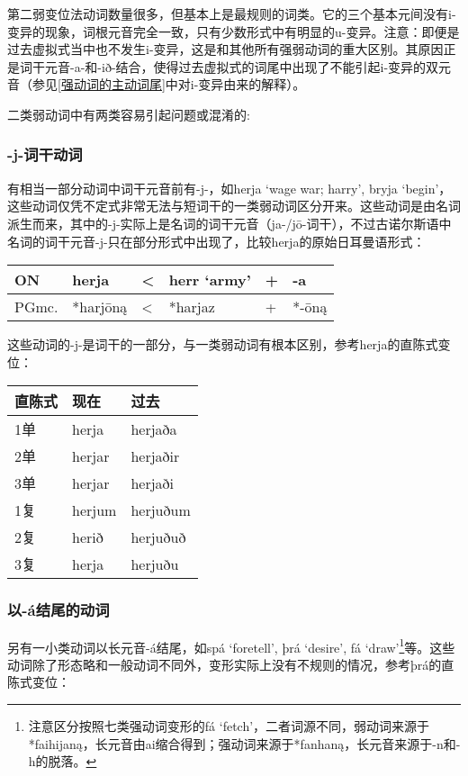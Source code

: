 第二弱变位法动词数量很多，但基本上是最规则的词类。它的三个基本元间没有i-变异的现象，词根元音完全一致，只有少数形式中有明显的u-变异。注意：即便是过去虚拟式当中也不发生i-变异，这是和其他所有强弱动词的重大区别。其原因正是词干元音-a-和-ið-结合，使得过去虚拟式的词尾中出现了不能引起i-变异的双元音（参见\ref{强动词的主动词尾}中对i-变异由来的解释）。

二类弱动词中有两类容易引起问题或混淆的:


\subsubsection{-j-词干动词}


有相当一部分动词中词干元音前有-j-，如herja `wage war; harry', bryja
`begin'，这些动词仅凭不定式非常无法与短词干的一类弱动词区分开来。这些动词是由名词派生而来，其中的-j-实际上是名词的词干元音（ja-/jō-词干），不过古诺尔斯语中名词的词干元音-j-只在部分形式中出现了，比较herja的原始日耳曼语形式：

\begin{longtable}{llllll}
    \toprule
    ON    & herja    & < & herr `army' & + & -a    \\
    \midrule
    \endhead
    \bottomrule
    \endfoot
    PGmc. & *harjōną & < & *harjaz     & + & *-ōną \\
\end{longtable}

这些动词的-j-是词干的一部分，与一类弱动词有根本区别，参考herja的直陈式变位：

\begin{longtable}{lll}
    \toprule
    直陈式 & 现在     & 过去       \\
    \midrule
    \endhead
    \bottomrule
    \endfoot
    1单  & herja  & herjaða  \\
    2单  & herjar & herjaðir \\
    3单  & herjar & herjaði  \\
    1复  & herjum & herjuðum \\
    2复  & herið  & herjuðuð \\
    3复  & herja  & herjuðu  \\
\end{longtable}


\subsubsection{以-á结尾的动词}


另有一小类动词以长元音-á结尾，如spá `foretell', þrá `desire', fá `draw'\footnote{注意区分按照七类强动词变形的fá `fetch'，二者词源不同，弱动词来源于*faihijaną，长元音由ai缩合得到；强动词来源于*fanhaną，长元音来源于-n和-h的脱落。}等。这些动词除了形态略和一般动词不同外，变形实际上没有不规则的情况，参考þrá的直陈式变位：

